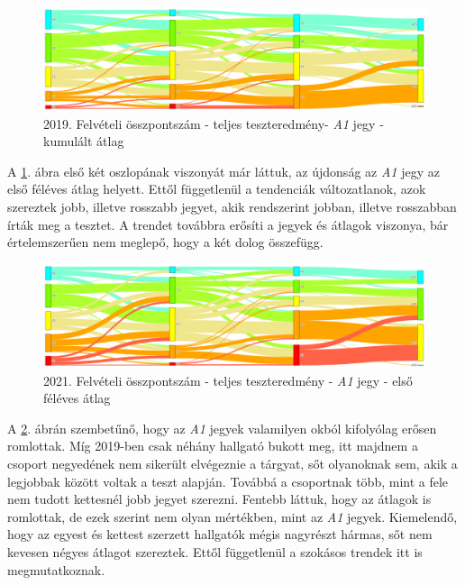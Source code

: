 \documentclass[12pt]{article}
\begin{document}
\begin{figure}[H]
\centering
\includegraphics[width = \textwidth]{kepek/2019_felvi_teszt_a1_kumatl.png}
\caption{2019. Felvételi összpontszám - teljes teszteredmény- \textit{A1} jegy - kumulált átlag}
\label{fig:2019_felvi_teszt_a1_kumatl}
\end{figure}

A \ref{fig:2019_felvi_teszt_a1_kumatl}. ábra első két oszlopának viszonyát már láttuk, az újdonság az \textit{A1} jegy az első féléves átlag helyett. Ettől függetlenül a tendenciák változatlanok, azok szereztek jobb, illetve rosszabb jegyet, akik rendszerint jobban, illetve rosszabban írták meg a tesztet. A trendet továbbra erősíti a jegyek és átlagok viszonya, bár értelemszerűen nem meglepő, hogy a két dolog összefügg.

\begin{figure}[H]
\centering
\includegraphics[width = \textwidth]{kepek/2021_felvi_teszt_a1_atlag.png}
\caption{2021. Felvételi összpontszám - teljes teszteredmény - \textit{A1} jegy - első féléves átlag}
\label{fig:2021_felvi_teszt_a1_atlag}
\end{figure}

A \ref{fig:2021_felvi_teszt_a1_atlag}. ábrán szembetűnő, hogy az \textit{A1} jegyek valamilyen okból kifolyólag erősen romlottak. Míg 2019-ben csak néhány hallgató bukott meg, itt majdnem a csoport negyedének nem sikerült elvégeznie a tárgyat, sőt olyanoknak sem, akik a legjobbak között voltak a teszt alapján. Továbbá a csoportnak több, mint a fele nem tudott kettesnél jobb jegyet szerezni. Fentebb láttuk, hogy az átlagok is romlottak, de ezek szerint nem olyan mértékben, mint az \textit{A1} jegyek. Kiemelendő, hogy az egyest és kettest szerzett hallgatók mégis nagyrészt hármas, sőt nem kevesen négyes átlagot szereztek. Ettől függetlenül a szokásos trendek itt is megmutatkoznak.
 
\end{document}
